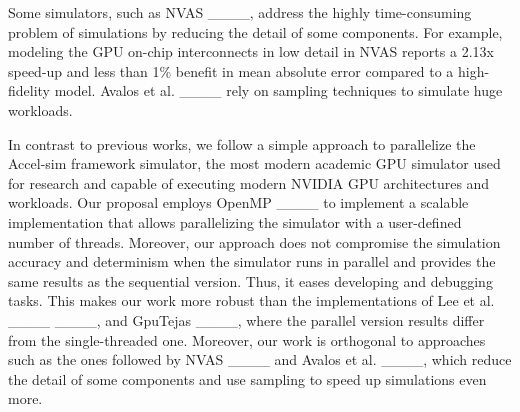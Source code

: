 \par
Some simulators, such as NVAS ____, address the highly time-consuming problem of simulations by reducing the detail of some components. For example, modeling the GPU on-chip interconnects in low detail in NVAS reports a 2.13x speed-up and less than 1\% benefit in mean absolute error compared to a high-fidelity model. Avalos et al. ____ rely on sampling techniques to simulate huge workloads.

\par
In contrast to previous works, we follow a simple approach to parallelize the Accel-sim framework simulator, the most modern academic GPU simulator used for research and capable of executing modern NVIDIA GPU architectures and workloads. Our proposal employs OpenMP ____ to implement a scalable implementation that allows parallelizing the simulator with a user-defined number of threads. Moreover, our approach does not compromise the simulation accuracy and determinism when the simulator runs in parallel and provides the same results as the sequential version. Thus, it eases developing and debugging tasks. This makes our work more robust than the implementations of Lee et al. ____ ____, and GpuTejas ____, where the parallel version results differ from the single-threaded one. Moreover, our work is orthogonal to approaches such as the ones followed by NVAS ____ and Avalos et al. ____, which reduce the detail of some components and use sampling to speed up simulations even more.